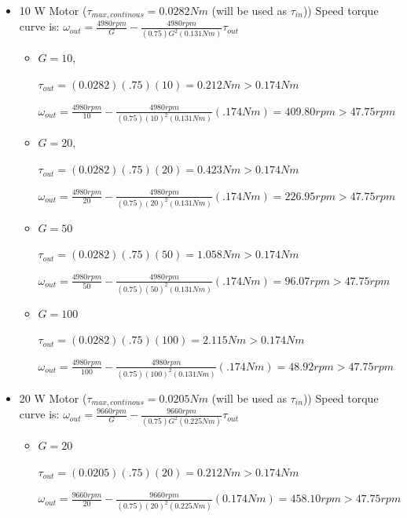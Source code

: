 \documentclass[12pt]{article}
\begin{document}
\begin{itemize}
\begin{itemize}
        \item 
        10 W Motor ($\tau_{max, continous} = 0.0282 Nm$ (will be used as $\tau_{in}$))
        Speed torque curve is: $\omega_{out} = \frac{4980rpm}{G} - \frac{4980rpm}{(0.75)G^2(0.131Nm)}\tau_{out}$
        \begin{itemize}
            \item
            $G=10$, 

            $\tau_{out} = (0.0282) (.75) (10) = 0.212 Nm > 0.174 Nm$

            $\omega_{out} = \frac{4980rpm}{10} - \frac{4980rpm}{(0.75)(10)^2(0.131Nm)}(.174Nm) = 409.80 rpm > 47.75rpm$

            \item
            $G=20$,

            $\tau_{out} = (0.0282) (.75) (20) = 0.423 Nm > 0.174 Nm$

            $\omega_{out} = \frac{4980rpm}{20} - \frac{4980rpm}{(0.75)(20)^2(0.131Nm)}(.174Nm) = 226.95 rpm > 47.75rpm$

            \item
            $G=50$

            $\tau_{out} = (0.0282) (.75) (50) = 1.058 Nm > 0.174 Nm$

            $\omega_{out} = \frac{4980rpm}{50} - \frac{4980rpm}{(0.75)(50)^2(0.131Nm)}(.174Nm) = 96.07 rpm > 47.75rpm$

            \item
            $G=100$

            $\tau_{out} = (0.0282) (.75) (100) = 2.115 Nm > 0.174 Nm$

            $\omega_{out} = \frac{4980rpm}{100} - \frac{4980rpm}{(0.75)(100)^2(0.131Nm)}(.174Nm) = 48.92 rpm > 47.75rpm$

        \end{itemize}

        \item 
        20 W Motor ($\tau_{max, continous} = 0.0205 Nm$ (will be used as $\tau_{in}$))
        Speed torque curve is: $\omega_{out} = \frac{9660rpm}{G} - \frac{9660rpm}{(0.75)G^2(0.225Nm)}\tau_{out}$
        \begin{itemize}
            \item
            $G=20$

            $\tau_{out} = (0.0205) (.75) (20) = 0.212 Nm > 0.174 Nm$

            $\omega_{out} = \frac{9660rpm}{20} - \frac{9660rpm}{(0.75)(20)^2(0.225Nm)}(0.174Nm) = 458.10 rpm > 47.75 rpm$


\end{itemize}
\end{itemize}
\end{itemize}
\end{document}
